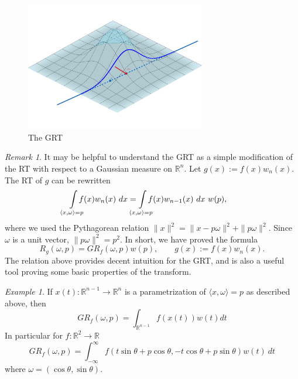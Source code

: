 \documentclass{amsart}
\theoremstyle{remark}
\newtheorem{example}[theorem]{Example}
\newtheorem{remark}[theorem]{Remark}
\numberwithin{equation}{section}
\newcommand{\RR}{\mathbb{R}}
\def\mclimits_#1{\limits_{\mathclap{#1}}}
\begin{document}
\begin{figure}[h]
    \centering
    \includegraphics[width=0.7\textwidth]{Images/GRT.png}
    \caption{The GRT}\label{fig:GRT}
\end{figure}

\begin{remark}
It may be helpful to understand the GRT as a simple modification of the RT with respect to a Gaussian measure on $\RR^n$. Let $g(x) := f(x)w_n(x)$. The RT of $g$ can be rewritten
\begin{align*}
    \int\mclimits_{\langle x, \omega \rangle = p} f(x) w_n(x) ~dx
    &= \int\mclimits_{\langle x, \omega \rangle = p} f(x) w_{n-1}(x) ~dx~ w(p),
\end{align*}
where we used the Pythagorean relation $\|x\|^2 = \|x - p\omega\|^2 + \|p\omega\|^2$. Since $\omega$ is a unit vector, $\|p\omega\|^2 = p^2$. In short, we have proved the formula
\begin{equation}
    \label{eq:GRTPythag}
    R_g(\omega, p) = GR_f(\omega, p) w(p), \qquad g(x) := f(x)w_n(x).
\end{equation}
The relation above provides decent intuition for the GRT, and is also a useful tool proving some basic properties of the transform.
\end{remark}

\begin{example}
If $x(t):\RR^{n-1} \longrightarrow \RR^n$ is a parametrization of $\langle x, \omega\rangle = p$ as described above, then
\[
    GR_f(\omega, p) = \int_{\RR^{n-1}}f(x(t)) w(t) dt
\]
In particular for $f:\RR^2 \rightarrow \RR$
\[
    GR_f(\omega, p) = \int_{-\infty}^\infty f(t \sin \theta + p \cos \theta, -t \cos \theta + p \sin \theta) w(t)~dt
\]
where $\omega = (\cos \theta, \sin \theta)$.
\end{example}
\end{document}
